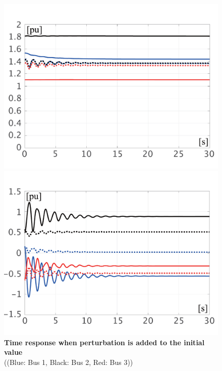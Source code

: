 \documentclass[graybox, envcountchap]{svmult}
\begin{document}
\begin{figure}[t]
{\begin{minipage}{0.49\linewidth}
    \includegraphics[width = 1.0\linewidth]{figs/EabsV0}
    \medskip
  \end{minipage}
  \begin{minipage}{0.49\linewidth}
    \centering
    \includegraphics[width = 1.0\linewidth]{figs/PQ0}
    \medskip
  \end{minipage}
  }
  \medskip
  \caption{\textbf{Time response when perturbation is added to the initial value}
  \\  \centering((Blue: Bus 1, Black: Bus 2, Red: Bus 3))}
  \label{fig:Kron0}
\medskip
\end{figure}
\end{document}
